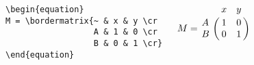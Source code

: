\begin{frame}[fragile]
  \begin{columns}[c]
  \begin{verbatim}
\begin{equation}
M = \bordermatrix{~ & x & y \cr
                  A & 1 & 0 \cr
                  B & 0 & 1 \cr}
\end{equation}
  \end{verbatim}
  \begin{fmpage}{\textwidth}
\begin{equation}
M = \bordermatrix{~ & x & y \cr
                  A & 1 & 0 \cr
                  B & 0 & 1 \cr}
\end{equation}
  \end{fmpage}
  \end{columns}
\end{frame}


